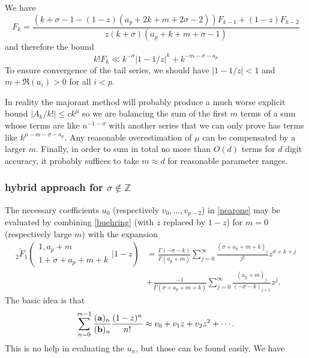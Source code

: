 \documentclass[10pt]{article}
\numberwithin{equation}{section}
\begin{document}
We have
\begin{equation*}
F_k=\frac{\left(k+\sigma -1 - (1-z) \left(a_p+2 k+m+2 \sigma
   -2\right)\right) F_{k-1} +(1-z) F_{k-2}}{z (k+\sigma )
   \left(a_p+k+m+\sigma -1\right)}
\end{equation*}
and therefore the bound
\begin{equation*}
k!F_k \ll k^{-\sigma} \left|1-1/z\right|^k + k^{-m-\sigma-a_p}
\end{equation*}
To ensure convergence of the tail series, we should have
$|1-1/z|<1$ and $m+\Re(a_i)>0$ for all $i<p$.

In reality the majorant method will probably produce a much worse explicit bound $|A_k/k!| \le c k^{\mu}$ so we are balancing the sum of the first $m$ terms of a sum whose terms are like $n^{-1-\sigma}$ with another series that we can only prove has terms like $k^{\mu-m-\sigma-a_p}$. Any reasonable overestimation of $\mu$ can be compensated by a larger $m$. Finally, in order to sum in total no more than $O(d)$ terms for $d$ digit accuracy, it probably suffices to take $m \approx d$ for reasonable parameter ranges.

\subsubsection{hybrid approach for $\sigma \not \in \mathbb{Z}$}
The necessary coefficients $u_0$ (respectively $v_0,\dots,v_{p-2}$) in \eqref{nearone} may be evaluated by combining \eqref{buehring} (with $z$ replaced by $1-z$) for $m=0$ (respectively large $m$) with the expansion
\begin{align*}
{}_2\tilde{F}_1\left(\begin{array}{c} 1,a_p+m \\ 1+\sigma+a_p+m+k \end{array} \Big| 1-z\right) &= \frac{\Gamma (-\sigma-k)}{\Gamma (a_p+m)} \sum_{j=0}^{\infty} \frac{(\sigma+a_p+m+k)_j}{j!}z^{\sigma+k+j}\\
&+\frac{-1}{\Gamma
   \left(\sigma+a_p+m+k\right)} \sum_{j=0}^{\infty} \frac{(a_p+m)_j}{(-\sigma-k)_{j+1}} z^j\text{.}
\end{align*}
The basic idea is that
\begin{equation*}
\sum_{n=0}^{m-1} \frac{(\bold a)_n}{(\bold b)_n}\frac{(1-z)^n}{n!} \approx v_0 + v_1 z + v_2 z^2 + \cdots\text{.}
\end{equation*}
This is no help in evaluating the $u_n$, but those can be found easily. We have
\end{document}
